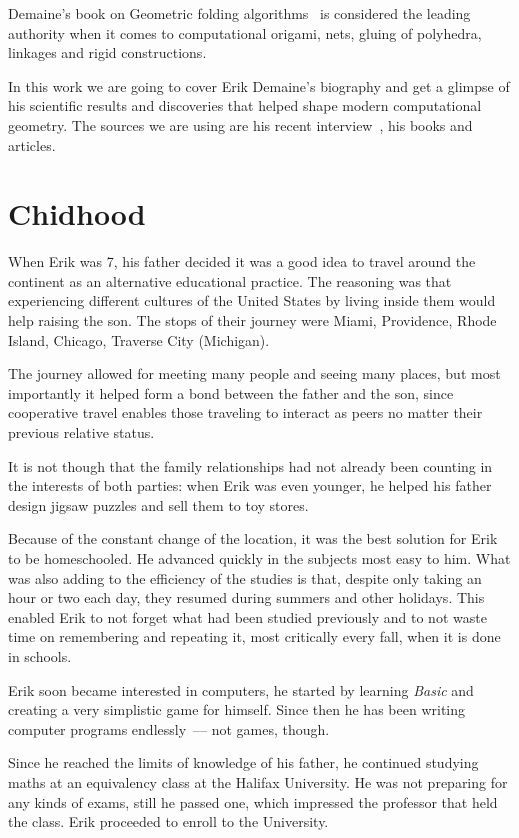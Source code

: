 \documentclass[a4paper,12pt]{article}
\begin{document}
Demaine's book on Geometric folding algorithms~\cite{DO07} is considered the leading authority when it comes to computational origami, nets, gluing of polyhedra, linkages and rigid constructions.

In this work we are going to cover Erik Demaine's biography and get a glimpse of his scientific results and discoveries that helped shape modern computational geometry. The sources we are using are his recent interview~\cite{yt}, his books and articles.

\section{Chidhood}

When Erik was 7, his father decided it was a good idea to travel around the continent as an alternative educational practice. The reasoning was that experiencing different cultures of the United States by living inside them would help raising the son. The stops of their journey were Miami, Providence, Rhode Island, Chicago, Traverse City (Michigan).

The journey allowed for meeting many people and seeing many places, but most importantly it helped form a bond between the father and the son, since cooperative travel enables those traveling to interact as peers no matter their previous relative status.

It is not though that the family relationships had not already been counting in the interests of both parties: when Erik was even younger, he helped his father design jigsaw puzzles and sell them to toy stores.

Because of the constant change of the location, it was the best solution for Erik to be homeschooled. He advanced quickly in the subjects most easy to him. What was also adding to the efficiency of the studies is that, despite only taking an hour or two each day, they resumed during summers and other holidays. This enabled Erik to not forget what had been studied previously and to not waste time on remembering and repeating it, most critically every fall, when it is done in schools.

Erik soon became interested in computers, he started by learning {\it Basic} and creating a very simplistic game for himself. Since then he has been writing computer programs endlessly~— not games, though.

Since he reached the limits of knowledge of his father, he continued studying maths at an equivalency class at the Halifax University. He was not preparing for any kinds of exams, still he passed one, which impressed the professor that held the class. Erik proceeded to enroll to the University.
\end{document}
